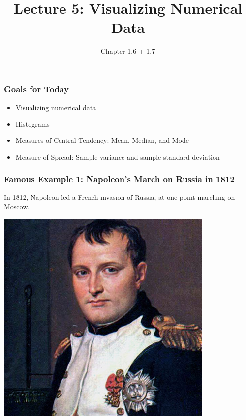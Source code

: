 \documentclass[handout]{beamer}
\title{Lecture 5: Visualizing Numerical Data}
\author{Chapter 1.6 + 1.7}
\date{}
\begin{document}
\begin{frame}
\titlepage
\end{frame}



\begin{frame}
\frametitle{Goals for Today}

\begin{itemize}
\item Visualizing numerical data
\item Histograms
\item Measures of Central Tendency: Mean, Median, and Mode
\item Measure of Spread:  Sample variance and sample standard deviation
\end{itemize}

\end{frame}


\begin{frame}
\frametitle{Famous Example 1:  Napoleon's March on Russia in 1812}

In 1812, Napoleon led a French invasion of Russia, at one point marching on Moscow.  
\begin{center}
\includegraphics[height=0.6\textheight]{figure/napoleon.jpg}
\end{center}

\end{frame}
\end{document}
